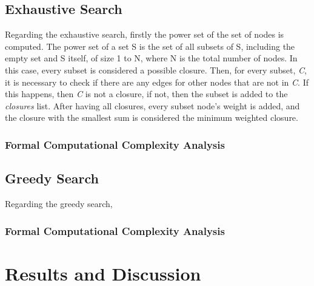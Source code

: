 \documentclass[...]{revdetua}
\begin{document}
\subsection{Exhaustive Search}

Regarding the exhaustive search, firstly the power set of the set of nodes is computed. The power set of a set S is the set of all subsets of S, including the empty set and S itself, of size 1 to N, where N is the total number of nodes. In this case, every subset is considered a possible closure. Then, for every subset, \textit{C}, it is necessary to check if there are any edges for other nodes that are not in \textit{C}. If this happens, then \textit{C} is not a closure, if not, then the subset is added to the \textit{closures} list. After having all closures, every subset node's weight is added, and the closure with the smallest sum is considered the minimum weighted closure.

\subsubsection{Formal Computational Complexity Analysis}


\subsection{Greedy Search}

Regarding the greedy search, 

\subsubsection{Formal Computational Complexity Analysis}



\section{Results and Discussion}


\begin{table}[!htb]
\caption{\label{tab:table-name}Obtained results for the Exhaustive Approach}
\end{table}
 
\end{document}
